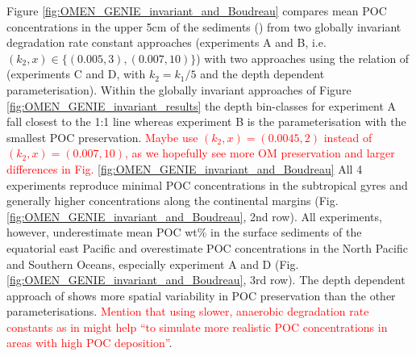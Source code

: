 \documentclass[gmd, manuscript]{copernicus}
\begin{document}
Figure \ref{fig:OMEN_GENIE_invariant_and_Boudreau} compares mean POC concentrations in the upper 5cm of the sediments () from two 
globally invariant degradation rate constant approaches (experiments A and B, i.e. $(k_2, x) \in \{(0.005, 3), (0.007, 10)\}$) 
with two approaches using the relation of \citet{boudreau1997diagenetic} (experiments C and D, with $k_2 = k_1/5$ and the depth dependent parameterisation). 
Within the globally invariant approaches of Figure \ref{fig:OMEN_GENIE_invariant_results} the depth bin-classes for experiment A fall closest to the 
1:1 line whereas experiment B is the parameterisation with the smallest POC preservation. 
\textcolor{red}{Maybe use $(k_2, x) = (0.0045, 2)$ instead of $(k_2, x) = (0.007, 10)$, as we hopefully see more OM preservation and larger differences 
in Fig. \ref{fig:OMEN_GENIE_invariant_and_Boudreau}}
All 4 experiments reproduce minimal POC concentrations in the subtropical gyres and generally higher concentrations along the continental margins (Fig. \ref{fig:OMEN_GENIE_invariant_and_Boudreau}, 2nd row). 
All experiments, however, underestimate mean POC wt\% in the surface sediments of the equatorial east Pacific and overestimate POC concentrations 
in the North Pacific and Southern Oceans, especially experiment A and D (Fig. \ref{fig:OMEN_GENIE_invariant_and_Boudreau}, 3rd row). 
The depth dependent approach of \citet{boudreau1997diagenetic} shows more spatial variability in POC preservation than the other parameterisations. 
\textcolor{red}{Mention that using slower, anaerobic degradation rate constants as in \citet{palastanga_long_term_2011} might help ``to simulate more
realistic POC concentrations in areas with high POC deposition''}. 
\end{document}
